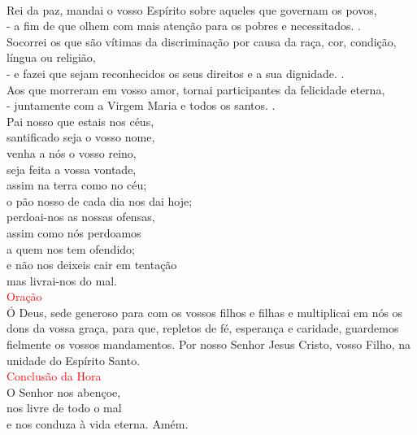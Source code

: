 \documentclass{book}
\begin{document}
\begin{center}
    \vspace{.2cm} \\
    Rei da paz, mandai o vosso Espírito sobre aqueles que governam os povos, \\
    - a fim de que olhem com mais atenção para os pobres e necessitados. {\color{red} \Rbar.}
    \vspace{.2cm} \\
    Socorrei os que são vítimas da discriminação por causa da raça, cor, condição, língua ou religião, \\
    - e fazei que sejam reconhecidos os seus direitos e a sua dignidade. {\color{red} \Rbar.}
    \vspace{.2cm} \\
    Aos que morreram em vosso amor, tornai participantes da felicidade eterna, \\
    - juntamente com a Virgem Maria e todos os santos. {\color{red} \Rbar.}
    \vspace{.2cm} \\
    Pai nosso que estais nos céus, \\
    santificado seja o vosso nome, \\
    venha a nós o vosso reino, \\
    seja feita a vossa vontade, \\
    assim na terra como no céu; \\
    o pão nosso de cada dia nos dai hoje; \\
    perdoai-nos as nossas ofensas, \\
    assim como nós perdoamos \\
    a quem nos tem ofendido; \\
    e não nos deixeis cair em tentação \\
    mas livrai-nos do mal.
    \vspace{.2cm} \\
    \textcolor{red}{Oração}
    \vspace{.2cm} \\
    Ó Deus, sede generoso para com os vossos filhos e filhas e multiplicai em nós os dons da vossa graça, para que, repletos de fé, esperança e caridade, guardemos fielmente os vossos mandamentos. Por nosso Senhor Jesus Cristo, vosso Filho, na unidade do Espírito Santo.
    \vspace{.2cm} \\
    \textcolor{red}{Conclusão da Hora}
    \vspace{.2cm} \\
    O Senhor nos abençoe, \\
    nos livre de todo o mal \\
    e nos conduza à vida eterna. Amém.
\end{center}
\end{document}
